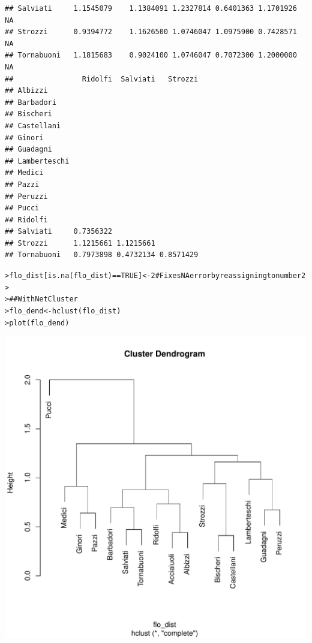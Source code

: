 \documentclass[12pt]{article}\usepackage[]{graphicx}\usepackage[]{color}
\makeatletter
\newcommand{\hlnum}[1]{\textcolor[rgb]{0.82,0.78,0.62}{#1}}%
\newcommand{\hlcom}[1]{\textcolor[rgb]{0.404,0.408,0.42}{#1}}%
\newcommand{\hlopt}[1]{\textcolor[rgb]{0.882,0.878,0.898}{#1}}%
\newcommand{\hlstd}[1]{\textcolor[rgb]{0.882,0.878,0.898}{#1}}%
\newcommand{\hlkwb}[1]{\textcolor[rgb]{0.902,0.675,0.196}{#1}}%
\newcommand{\hlkwd}[1]{\textcolor[rgb]{0.733,0.388,0.812}{#1}}%
\newenvironment{kframe}{%
 \def\at@end@of@kframe{}%
 \ifinner\ifhmode%
  \def\at@end@of@kframe{\end{minipage}}%
  \begin{minipage}{\columnwidth}%
 \fi\fi%
 \def\FrameCommand##1{\hskip\@totalleftmargin \hskip-\fboxsep
 \colorbox{shadecolor}{##1}\hskip-\fboxsep
     \hskip-\linewidth \hskip-\@totalleftmargin \hskip\columnwidth}%
 \MakeFramed {\advance\hsize-\width
   \@totalleftmargin\z@ \linewidth\hsize
   \@setminipage}}%
 {\par\unskip\endMakeFramed%
 \at@end@of@kframe}
\newenvironment{knitrout}{}{} %
\makeatother
\begin{document}
\begin{flushleft}
\begin{center}
\begin{knitrout}
\begin{kframe}
\begin{verbatim}
## Salviati     1.1545079    1.1384091 1.2327814 0.6401363 1.1701926        NA
## Strozzi      0.9394772    1.1626500 1.0746047 1.0975900 0.7428571        NA
## Tornabuoni   1.1815683    0.9024100 1.0746047 0.7072300 1.2000000        NA
##                Ridolfi  Salviati   Strozzi
## Albizzi                                   
## Barbadori                                 
## Bischeri                                  
## Castellani                                
## Ginori                                    
## Guadagni                                  
## Lamberteschi                              
## Medici                                    
## Pazzi                                     
## Peruzzi                                   
## Pucci                                     
## Ridolfi                                   
## Salviati     0.7356322                    
## Strozzi      1.1215661 1.1215661          
## Tornabuoni   0.7973898 0.4732134 0.8571429
\end{verbatim}
\begin{alltt}
\hlstd{> }\hlstd{flo_dist[}\hlkwd{is.na}\hlstd{(flo_dist)}\hlopt{==}\hlnum{TRUE}\hlstd{]}\hlkwb{<-}\hlnum{2} \hlcom{# Fixes NA error by reassigning to number 2}
\hlstd{> }
\hlstd{> }\hlcom{## With NetCluster}
\hlstd{> }\hlstd{flo_dend} \hlkwb{<-} \hlkwd{hclust}\hlstd{(flo_dist)}
\hlstd{> }\hlkwd{plot}\hlstd{(flo_dend)}
\end{alltt}
\end{kframe}
\includegraphics[width=6in]{figure/Network_Properties-1} 

\end{knitrout}
\end{center}
\end{flushleft}
\end{document}

